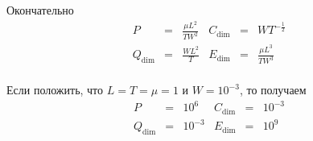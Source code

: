 Окончательно
\begin{equation}
    \begin{array}{rclrclrcl}
        P & = & \frac{\mu L^2}{TW^2} & C_\text{dim} & = & WT^{-\frac{1}{2}} \\
        Q_\text{dim} & = & \frac{WL^2}{T} & E_\text{dim} & = & \frac{\mu L^3}{TW^3} \\
    \end{array}
\end{equation}

Если положить, что $L = T = \mu = 1$ и $W = 10^{-3}$, то получаем
\begin{equation}
    \begin{array}{rclrclrcl}
        P & = & 10^6 & C_\text{dim} & = & 10^{-3} \\
        Q_\text{dim} & = & 10^{-3} & E_\text{dim} & = & 10^9 \\
    \end{array}
\end{equation}